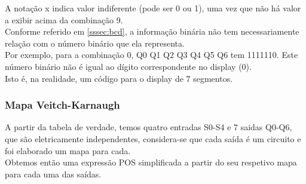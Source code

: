 \documentclass[12pt,a4paper,portrait]{article}
\begin{document}
			A notação x indica valor indiferente (pode ser 0 ou 1), uma vez que não há valor a exibir acima da combinação 9.\\
			Conforme referido em \ref{sssec:bcd}, a informação binária não tem necessariamente relação com o número binário que ela representa.\\
			Por exemplo, para a combinação 0, Q0 Q1 Q2 Q3 Q4 Q5 Q6 tem 1111110. Este número binário não é igual ao dígito correspondente no display (0).\\
			Isto é, na realidade, um código para o display de 7 segmentos.\\			
			\subsubsection{Mapa Veitch-Karnaugh}
			 A partir da tabela de verdade, temos quatro entradas S0-S4 e 7 saidas Q0-Q6, que são eletricamente independentes, considera-se que cada saída é um circuito e foi elaborado um mapa para cada.\\
			 Obtemos então uma expressão POS simplificada a partir do seu respetivo mapa para cada uma das saídas.\\
			\begin{minipage}{1.1\textwidth}
				\begin{minipage}[b]{0.49\textwidth}
					\centering
				\end{minipage}
				\hfill
				\begin{minipage}[b]{0.49\textwidth}
					\centering
				\end{minipage}
			\end{minipage}\\
			\begin{minipage}{1.1\textwidth}
				\begin{minipage}[b]{0.49\textwidth}
					\centering
				\end{minipage}
				\hfill
				\begin{minipage}[b]{0.49\textwidth}
					\centering
				\end{minipage}
			\end{minipage}\\
\end{document}
